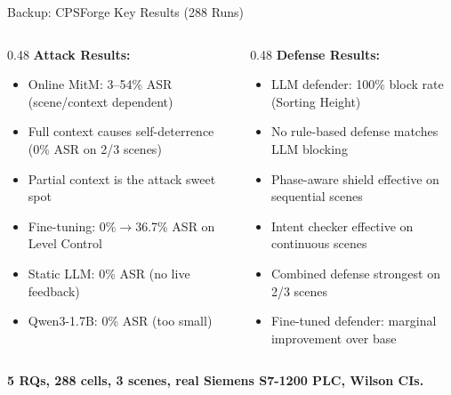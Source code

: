 \documentclass[aspectratio=169,10pt]{beamer}
\begin{document}
\begin{frame}{Backup: CPSForge Key Results (288 Runs)}

\begin{columns}[T]
\begin{column}{0.48\textwidth}
\textbf{Attack Results:}
\begin{itemize}\small
    \item Online MitM: 3--54\% ASR (scene/context dependent)
    \item Full context causes self-deterrence (0\% ASR on 2/3 scenes)
    \item Partial context is the attack sweet spot
    \item Fine-tuning: 0\%$\rightarrow$36.7\% ASR on Level Control
    \item Static LLM: 0\% ASR (no live feedback)
    \item Qwen3-1.7B: 0\% ASR (too small)
\end{itemize}
\end{column}

\begin{column}{0.48\textwidth}
\textbf{Defense Results:}
\begin{itemize}\small
    \item LLM defender: 100\% block rate (Sorting Height)
    \item No rule-based defense matches LLM blocking
    \item Phase-aware shield effective on sequential scenes
    \item Intent checker effective on continuous scenes
    \item Combined defense strongest on 2/3 scenes
    \item Fine-tuned defender: marginal improvement over base
\end{itemize}
\end{column}
\end{columns}

\vspace{0.5em}
\textbf{5 RQs, 288 cells, 3 scenes, real Siemens S7-1200 PLC, Wilson CIs.}
\end{frame}
\end{document}
